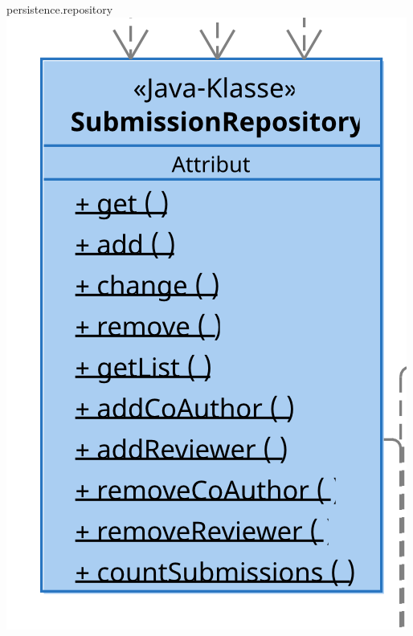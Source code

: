 \documentclass{beamer}
\begin{document}
    \begin{frame}{persistence.repository}
        \centering
        \includegraphics[height=0.9\textheight]{excerpts/SubmissionRepository@3x}
    \end{frame}
\end{document}
